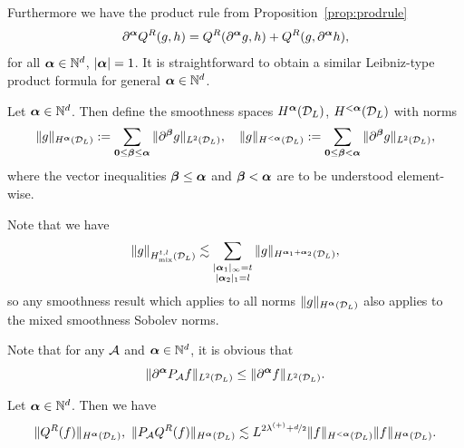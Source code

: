 Furthermore we have the product rule from Proposition~\ref{prop:prodrule}
\begin{equation}\label{eq:prodrule}
    \partial^{\bm\alpha} Q^R(g,h)=Q^R(\partial^{\bm\alpha} g,h)+Q^R(g,\partial^{\bm\alpha} h),
\end{equation}
for all ${\bm\alpha} \in \mathbb{N}^d$, $|{\bm\alpha}| = 1$. It is straightforward to
obtain a similar Leibniz-type product formula for general ${\bm\alpha} \in
\mathbb{N}^d$.
\begin{definition} \label{def:spaces}
    Let ${\bm\alpha}\in \mathbb{N}^d$. Then define the smoothness 
    spaces $H^{\bm\alpha}(\mathcal{D}_L)$, $H^{<{\bm\alpha}}(\mathcal{D}_L)$ with norms
    $$
        \|g\|_{H^{\bm\alpha}(\mathcal{D}_L)}:= \sum_{{\bm0} \leq {\bm\beta} \le {\bm\alpha}}\|\partial^{\bm\beta} g
        \|_{L^2(\mathcal{D}_L)},\quad
        \|g\|_{H^{<{\bm\alpha}}(\mathcal{D}_L)}:= \sum_{{\bm0} \leq {\bm\beta} < {\bm\alpha}}\|\partial^{\bm\beta} g
        \|_{L^2(\mathcal{D}_L)},
    $$
    where the vector inequalities ${\bm\beta} \leq {\bm\alpha}$ and ${\bm\beta} < {\bm\alpha}$ are to be understood
    element-wise.
\end{definition}
\begin{remark}
    Note that we have
    $$
        \|g\|_{{H}_{\mathrm{mix}}^{t,l}(\mathcal{D}_L)}
        \lesssim \sum_{\substack{|{\bm\alpha}_1|_\infty=t\\ |{\bm\alpha}_2|_1=l}}
        \|g\|_{H^{{\bm\alpha}_1+{\bm\alpha}_2}(\mathcal{D}_L)},
    $$
    so any smoothness result which applies to all norms 
    $\|g\|_{H^{\bm\alpha}(\mathcal{D}_L)}$ also applies to the mixed smoothness
    Sobolev norms.
\end{remark}
Note that for any $\mathcal{A}$ and ${\bm\alpha}\in\mathbb{N}^d$, it is obvious that
\begin{equation}\label{eq:contr}
    \|\partial^{\bm\alpha} P_{\mathcal{A}} f\|_{L^2(\mathcal{D}_L)} \le \|\partial^{\bm\alpha} f\|_{L^2(\mathcal{D}_L)}.
\end{equation}
\begin{lemma}\label{lem:boundsmooth}
    Let ${\bm\alpha} \in \mathbb{N}^d$. Then we have
    $$
        \|Q^R(f)\|_{H^{\bm\alpha}(\mathcal{D}_L)},\ \|P_{\mathcal{A}} Q^R(f)\|_{H^{\bm\alpha}(\mathcal{D}_L)}
        \lesssim L^{2\lambda^{(+)}+\nicefrac{d}{2}} 
        \|f\|_{H^{<{\bm\alpha}}(\mathcal{D}_L)}
        \|f\|_{H^{\bm\alpha}(\mathcal{D}_L)}.
    $$
\end{lemma}
